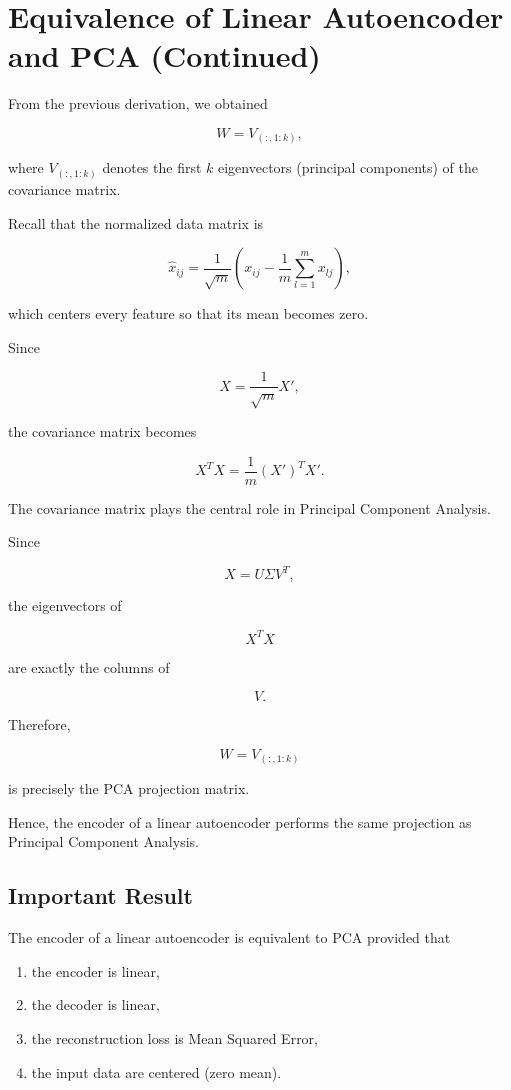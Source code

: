 \documentclass{article}
\begin{document}
\section{Equivalence of Linear Autoencoder and PCA (Continued)}

From the previous derivation, we obtained

\[
W = V_{(:,1:k)},
\]

where \(V_{(:,1:k)}\) denotes the first \(k\) eigenvectors (principal
components) of the covariance matrix.

Recall that the normalized data matrix is

\[
\hat{x}_{ij}
=
\frac{1}{\sqrt{m}}
\left(
x_{ij}
-
\frac{1}{m}
\sum_{l=1}^{m}x_{lj}
\right),
\]

which centers every feature so that its mean becomes zero.

Since

\[
X=\frac{1}{\sqrt{m}}X',
\]

the covariance matrix becomes

\[
X^{T}X
=
\frac{1}{m}(X')^{T}X'.
\]

The covariance matrix plays the central role in Principal Component
Analysis.

Since

\[
X=U\Sigma V^{T},
\]

the eigenvectors of

\[
X^{T}X
\]

are exactly the columns of

\[
V.
\]

Therefore,

\[
W=V_{(:,1:k)}
\]

is precisely the PCA projection matrix.

Hence, the encoder of a linear autoencoder performs the same projection
as Principal Component Analysis.

\subsection{Important Result}

The encoder of a linear autoencoder is equivalent to PCA provided that

\begin{enumerate}
	\item the encoder is linear,
	\item the decoder is linear,
	\item the reconstruction loss is Mean Squared Error,
	\item the input data are centered (zero mean).
\end{enumerate}
\end{document}
